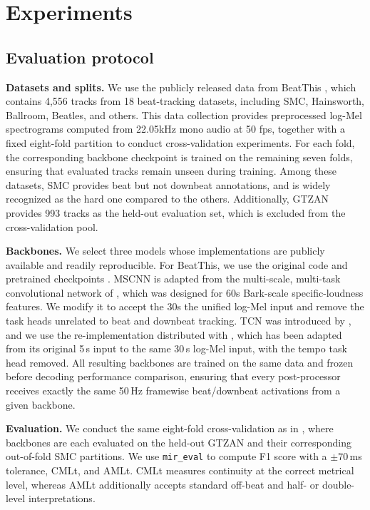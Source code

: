 \documentclass{article}
\begin{document}
\section{Experiments}\label{sec:exp}

\subsection{Evaluation protocol}
\textbf{Datasets and splits.} We use the publicly released data from BeatThis \cite{foscarin2024beat}, which contains 4,556 tracks from 18 beat-tracking datasets, including SMC, Hainsworth, Ballroom, Beatles, and others. This data collection provides preprocessed log-Mel spectrograms computed from 22.05kHz mono audio at 50 fps, together with a fixed eight-fold partition to conduct cross-validation experiments. For each fold, the corresponding backbone checkpoint is trained on the remaining seven folds, ensuring that evaluated tracks remain unseen during training. Among these datasets, SMC provides beat but not downbeat annotations, and is widely recognized as the hard one compared to the others. Additionally, GTZAN provides 993 tracks as the held-out evaluation set, which is excluded from the cross-validation pool.

\textbf{Backbones.} We select three models whose implementations are publicly available and readily reproducible. For BeatThis, we use the original code and pretrained checkpoints \cite{foscarin2024beat}. MSCNN is adapted from the multi-scale, multi-task convolutional network of \cite{he2026dynest}, which was designed for 60s Bark-scale specific-loudness features. We modify it to accept the 30s the unified log-Mel input and remove the task heads unrelated to beat and downbeat tracking. TCN was introduced by \cite{bock2020deconstruct}, and we use the re-implementation distributed with \cite{he2026dynest}, which has been adapted from its original 5\,s input to the same 30\,s log-Mel input, with the tempo task head removed. All resulting backbones are trained on the same data and frozen before decoding performance comparison, ensuring that every post-processor receives exactly the same 50\,Hz framewise beat/downbeat activations from a given backbone.

\textbf{Evaluation.} We conduct the same eight-fold cross-validation as in \cite{foscarin2024beat}, where backbones are each evaluated on the held-out GTZAN and their corresponding out-of-fold SMC partitions. We use \texttt{mir\_eval} \cite{raffel2014mireval} to compute F1 score with a $\pm70$\,ms tolerance, CMLt, and AMLt. CMLt measures continuity at the correct metrical level, whereas AMLt additionally accepts standard off-beat and half- or double-level interpretations.
\end{document}
